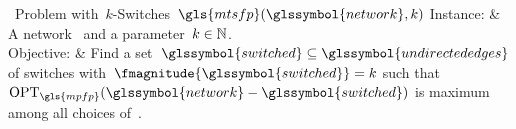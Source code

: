 \begin{problem}[framed]{\mtsf~Problem with~$k$-Switches~$\gls{mtsfp}(\glssymbol{network},k)$}
    Instance: & A network~ and a parameter~$k\in\mathbb{N}$.
    \\
    Objective: & Find a set~$\glssymbol{switched}\subseteq
    \glssymbol{undirectededges}$ of switches
    with~$\fmagnitude{\glssymbol{switched}} = k$ such that~$\opt_{\gls{mpfp}}
    (\glssymbol{network}-\glssymbol{switched})$ is maximum among all choices
    of~.
\end{problem} 

